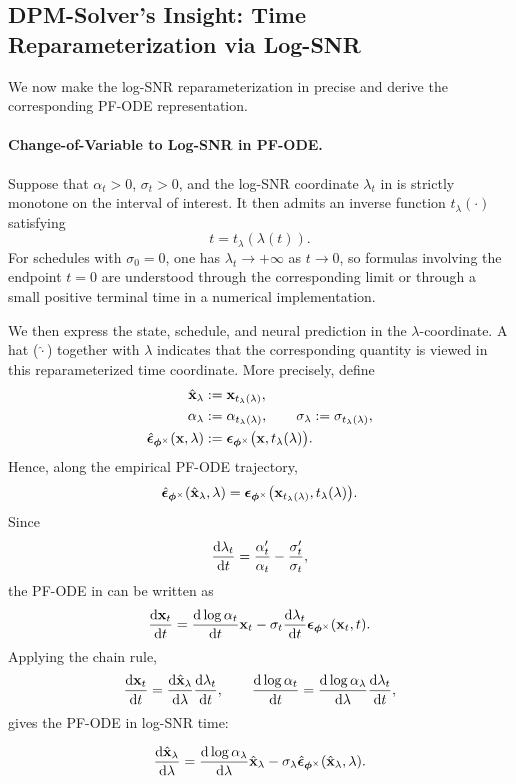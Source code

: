 \subsection{DPM-Solver's Insight: Time Reparameterization via Log-SNR}
\label{subsec:dpm-method}   

We now make the log-SNR reparameterization in  precise and
derive the corresponding PF-ODE representation.

\paragraph{Change-of-Variable to Log-SNR in PF-ODE.}
Suppose that $\alpha_t>0$, $\sigma_t>0$, and the log-SNR coordinate
$\lambda_t$ in  is strictly monotone on the interval of
interest. It then admits an inverse function $t_\lambda(\cdot)$ satisfying
\[
t=t_\lambda(\lambda(t)).
\]
For schedules with $\sigma_0=0$, one has $\lambda_t\to+\infty$ as
$t\to0$, so formulas involving the endpoint $t=0$ are understood through
the corresponding limit or through a small positive terminal time in a
numerical implementation.

We then express the state, schedule, and neural prediction in the
$\lambda$-coordinate. A hat ($\hat{\cdot}$) together with $\lambda$ indicates that the corresponding quantity is
viewed in this reparameterized time coordinate. More precisely, define
\begin{align}
\begin{aligned}
\label{eq:change-of-var-x-epsilon}
\hat{{\mathbf{x}}}_{\lambda}
&:=
{\mathbf{x}}_{t_\lambda(\lambda)},
\\
\alpha_\lambda
&:=
\alpha_{t_\lambda(\lambda)},
\qquad
\sigma_\lambda
:=
\sigma_{t_\lambda(\lambda)},
\\
\hat{\bm{\epsilon}}_{\bm{\phi}^\times}({\mathbf{x}},\lambda)
&:=
\bm{\epsilon}_{\bm{\phi}^\times}
\bigl(
{\mathbf{x}},
t_\lambda(\lambda)
\bigr).
\end{aligned}
\end{align}
Hence, along the empirical PF-ODE trajectory,
\[
\hat{\bm{\epsilon}}_{\bm{\phi}^\times}
(\hat{{\mathbf{x}}}_\lambda,\lambda)
=
\bm{\epsilon}_{\bm{\phi}^\times}
\bigl(
{\mathbf{x}}_{t_\lambda(\lambda)},
t_\lambda(\lambda)
\bigr).
\]
Since
\[
\frac{\mathop{}\!\mathrm{d}\lambda_t}{\mathop{}\!\mathrm{d} t}
=
\frac{\alpha_t'}{\alpha_t}
-
\frac{\sigma_t'}{\sigma_t},
\]
the PF-ODE in  can be written as
\[
\frac{\mathop{}\!\mathrm{d}{\mathbf{x}}_t}{\mathop{}\!\mathrm{d} t}
=
\frac{\mathop{}\!\mathrm{d}\log\alpha_t}{\mathop{}\!\mathrm{d} t}{\mathbf{x}}_t
-
\sigma_t
\frac{\mathop{}\!\mathrm{d}\lambda_t}{\mathop{}\!\mathrm{d} t}
\bm{\epsilon}_{\bm{\phi}^\times}({\mathbf{x}}_t,t).
\]
Applying the chain rule,
\[
\frac{\diff\rvx_t}{\diff t}
=
\frac{\diff\hat\rvx_\lambda}{\diff\lambda}
\frac{\diff\lambda_t}{\diff t},
\qquad
\frac{\diff\log\alpha_t}{\diff t}
=
\frac{\diff\log\alpha_\lambda}{\diff\lambda}
\frac{\diff\lambda_t}{\diff t},
\]
gives the PF-ODE in log-SNR time:
\begin{mdframed}
\begin{align}
\label{eq:diffusion_ode_lambda_eps}
\frac{\mathop{}\!\mathrm{d}\hat{{\mathbf{x}}}_\lambda}{\mathop{}\!\mathrm{d}\lambda}
=
\frac{\mathop{}\!\mathrm{d}\log\alpha_\lambda}{\mathop{}\!\mathrm{d}\lambda}
\hat{{\mathbf{x}}}_\lambda
-
\sigma_\lambda
\hat{\bm{\epsilon}}_{\bm{\phi}^\times}
(\hat{{\mathbf{x}}}_\lambda,\lambda).
\end{align}
\end{mdframed}

